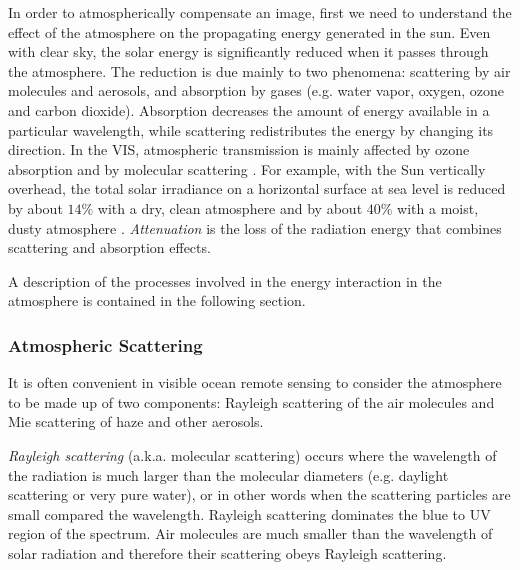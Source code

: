 In order to atmospherically compensate an image, first we need to understand the effect of the atmosphere on the propagating energy generated in the sun. Even with clear sky, the solar energy is significantly reduced when it passes through the atmosphere. The reduction is due mainly to two phenomena: scattering by air molecules and aerosols, and absorption by gases (e.g. water vapor, oxygen, ozone and carbon dioxide). Absorption decreases the amount of energy available in a particular wavelength, while scattering redistributes the energy by changing its direction. In the VIS, atmospheric transmission is mainly affected by ozone absorption and by molecular scattering \citep{Asrar1989}. For example, with the Sun vertically overhead, the total solar irradiance on a horizontal surface at sea level is reduced by about $14\%$ with a dry, clean atmosphere and by about $40\%$ with a moist, dusty atmosphere \citep{Kirk1983}. {\it Attenuation} is the loss of the radiation energy that combines scattering and absorption effects.



A description of the processes involved in the energy interaction in the atmosphere is contained in the following section. %
\subsubsection*{Atmospheric Scattering}

It is often convenient in visible ocean remote sensing to consider the atmosphere to be made up of two components: Rayleigh scattering of the air molecules and Mie scattering of haze and other aerosols. 

{\it Rayleigh scattering}  (a.k.a. molecular scattering) occurs where the wavelength of the radiation is much larger than the molecular diameters (e.g. daylight scattering or very pure water), or in other words when the scattering particles are small compared the wavelength. Rayleigh scattering dominates the blue to UV region of the spectrum. Air molecules are much smaller than the wavelength of solar radiation and therefore their scattering obeys Rayleigh scattering. 

